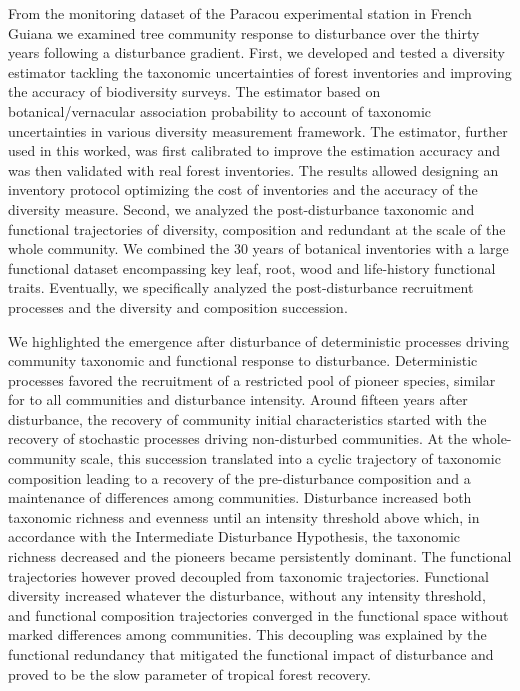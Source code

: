 \documentclass[
  11pt,
  french,
  A4paper,
  extrafontsizes,onecolumn,openright
  ]{memoir}
\begin{document}
\begin{normalsize}
\begin{description}
From the monitoring dataset of the Paracou experimental station in
French Guiana we examined tree community response to disturbance over
the thirty years following a disturbance gradient. First, we developed
and tested a diversity estimator tackling the taxonomic uncertainties of
forest inventories and improving the accuracy of biodiversity surveys.
The estimator based on botanical/vernacular association probability to
account of taxonomic uncertainties in various diversity measurement
framework. The estimator, further used in this worked, was first
calibrated to improve the estimation accuracy and was then validated
with real forest inventories. The results allowed designing an inventory
protocol optimizing the cost of inventories and the accuracy of the
diversity measure. Second, we analyzed the post-disturbance taxonomic
and functional trajectories of diversity, composition and redundant at
the scale of the whole community. We combined the 30 years of botanical
inventories with a large functional dataset encompassing key leaf, root,
wood and life-history functional traits. Eventually, we specifically
analyzed the post-disturbance recruitment processes and the diversity
and composition succession.\newline

We highlighted the emergence after disturbance of deterministic
processes driving community taxonomic and functional response to
disturbance. Deterministic processes favored the recruitment of a
restricted pool of pioneer species, similar for to all communities and
disturbance intensity. Around fifteen years after disturbance, the
recovery of community initial characteristics started with the recovery
of stochastic processes driving non-disturbed communities. At the
whole-community scale, this succession translated into a cyclic
trajectory of taxonomic composition leading to a recovery of the
pre-disturbance composition and a maintenance of differences among
communities. Disturbance increased both taxonomic richness and evenness
until an intensity threshold above which, in accordance with the
Intermediate Disturbance Hypothesis, the taxonomic richness decreased
and the pioneers became persistently dominant. The functional
trajectories however proved decoupled from taxonomic trajectories.
Functional diversity increased whatever the disturbance, without any
intensity threshold, and functional composition trajectories converged
in the functional space without marked differences among communities.
This decoupling was explained by the functional redundancy that
mitigated the functional impact of disturbance and proved to be the slow
parameter of tropical forest recovery.\newline


\end{description}
\end{normalsize}
\end{document}
